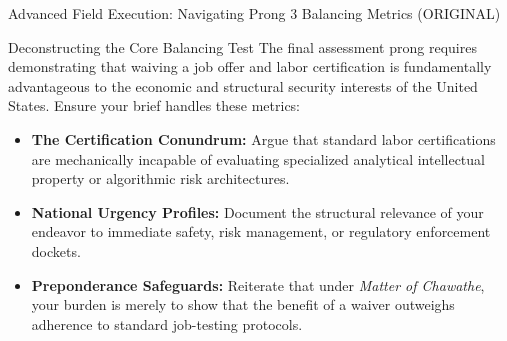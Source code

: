 \documentclass[11pt]{beamer}
\begin{document}
	\begin{frame}{Advanced Field Execution: Navigating Prong 3 Balancing Metrics (ORIGINAL)}
		\scriptsize
		\begin{block}{Deconstructing the Core Balancing Test}
			The final assessment prong requires demonstrating that waiving a job offer and labor certification is fundamentally advantageous to the economic and structural security interests of the United States. Ensure your brief handles these metrics:
			\begin{itemize}
				\item \textbf{The Certification Conundrum:} Argue that standard labor certifications are mechanically incapable of evaluating specialized analytical intellectual property or algorithmic risk architectures.
				\item \textbf{National Urgency Profiles:} Document the structural relevance of your endeavor to immediate safety, risk management, or regulatory enforcement dockets.
				\item \textbf{Preponderance Safeguards:} Reiterate that under \textit{Matter of Chawathe}, your burden is merely to show that the benefit of a waiver outweighs adherence to standard job-testing protocols.
			\end{itemize}
		\end{block}
	\end{frame}
	
	
\end{document}
